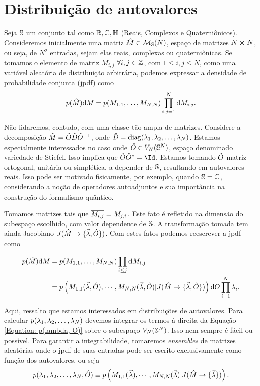 \section{Distribuição de autovalores}

Seja $\mathbb{S}$ um conjunto tal como $\mathbb{R}, \mathbb{C}, \mathbb{H} $ (Reais, Complexos e Quaterniônicos). Consideremos inicialmente uma matriz $\hat M \in \mathcal{M}_{\mathbb{S}}(N)$, espaço de matrizes $N \cross N$, ou seja, de $N^2$ entradas, sejam elas reais, complexas ou quaterniônicas. Se tomamos o elemento de matriz $M_{i,j}$ $\forall i, j \in \mathbb{Z}$, com $1 \leq i, j \leq N$, como uma variável aleatória de distribuição arbitrária, podemos expressar a densidade de probabilidade conjunta (jpdf) como $$p(\hat{M}) \dd M = p(M_{1,1}, \dots, M_{N,N}) \prod_{i,j=1}^{N} \dd M_{i,j}.$$

Não lidaremos, contudo, com uma classe tão ampla de matrizes. Considere a decomposição $\hat M = \hat O \hat D \hat O^{-1}$, onde $\hat D = \operatorname{diag}(\lambda_1, \lambda_2, \dots, \lambda_N)$. Estamos especialmente interessados no caso onde $\hat O \in V_N(\mathbb{S}^N)$, espaço denominado variedade de Stiefel. Isso implica que $ \matriz{O} \matriz{O}^* = \Id$. Estamos tomando $\hat O$ matriz ortogonal, unitária ou simplética, a depender de $\mathbb{S}$, resultando em autovalores reais. Isso pode ser motivado fisicamente, por exemplo, quando $\mathbb{S} = \mathbb{C}$, considerando a noção de operadores autoadjuntos e sua importância na construção do formalismo quântico.

Tomamos matrizes tais que $\overline{M_{i,j}} = M_{j, i}$. Este fato é refletido na dimensão do subespaço escolhido, com valor dependente de $\mathbb{S}$. A transformação tomada tem ainda Jacobiano $J(\hat M \rightarrow \{ \vec{\lambda}, \hat O \} )$. Com estes fatos podemos reescrever a jpdf como 

\begin{equation}
	\begin{split}
	 p(\hat{M}) \dd M &= p(M_{1,1}, \dots, M_{N,N}) \prod_{i \leq j} \dd M_{i,j}\\
	 & =  p \left( M_{1,1}(\vec{\lambda}, \hat O), \cdots, M_{N,N}(\vec{\lambda}, \hat O) | J(\hat M \rightarrow \{ \vec{\lambda}, \hat O \} ) \right) \dd O \prod_{i=1}^{N} \lambda_i.
	\end{split}
\label{Equation: p(lambda, O)}
\end{equation}

Aqui, ressalto que estamos interessados em distribuições de autovalores. Para calcular $p(\lambda_1, \lambda_2, \dots, \lambda_N)$ devemos integrar os termos à direita da Equação \ref{Equation: p(lambda, O)} sobre o subespaço $V_N(\mathbb{S}^N)$. Isso nem sempre é fácil ou possível. Para garantir a integrabilidade, tomaremos \textit{ensembles} de matrizes aleatórias onde o jpdf de suas entradas pode ser escrito exclusivamente como função dos autovalores, ou seja $$p(\lambda_1, \lambda_2, \dots, \lambda_N, \hat O) \equiv p \left( M_{1,1}(\vec{\lambda}), \cdots, M_{N,N}(\vec{\lambda}) | J(\hat M \rightarrow \{ \vec{\lambda} \} ) \right).$$

